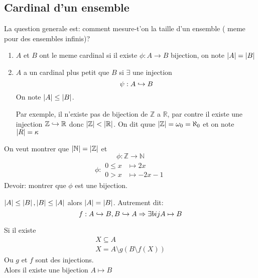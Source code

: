 \documentclass[../main.tex]{subfiles}
\begin{document}
\subsection{Cardinal d'un ensemble}
La question generale est: comment mesure-t'on la taille d'un ensemble ( meme pour des ensembles infinis)?\\
\begin{defn}\label{defn:cardinal_d_un_ensemble}
	\begin{enumerate}
		\item $A$ et  $B$ ont le meme cardinal si il existe $\phi: A \to B$ bijection, on note $\left\vert A\right\vert = \left\vert B\right\vert$\\
		\item $A$ a un cardinal plus petit que $B$ si $\exists$ une injection 
			\[ 
			\psi: A \hookrightarrow B
			\]
			On note $\left\vert A\right\vert \leq \left\vert B\right\vert$.

			Par exemple, il n'existe pas de bijection de $\mathbb{Z}$ a $\mathbb{R}$, par contre il existe une injection $\mathbb{Z} \hookrightarrow \mathbb{R}$ donc $\left\vert\mathbb{Z}\right\vert < \left\vert\mathbb{R}\right\vert$. On dit quue $\left\vert\mathbb{Z}\right\vert = \omega_0 = \aleph_0$ et on note $\left\vert R\right\vert= \kappa$
	\end{enumerate}
\end{defn}
\begin{exemple}
	On veut montrer que $\left\vert\mathbb{N}\right\vert = \left\vert\mathbb{Z}\right\vert$ et 
	\[ 
		\phi: \mathbb{Z} \to \mathbb{N}
	\]
	\begin{align*}
	\phi :
	\begin{aligned}
		0 \leq x &\mapsto 2x\\
	0>x &\mapsto -2x-1
	\end{aligned}
	\end{align*}
	Devoir: montrer que $\phi$ est une bijection.
\end{exemple}
\begin{thm}
	$\left\vert A\right\vert \leq \left\vert B\right\vert, \left\vert B\right\vert \leq \left\vert A\right\vert$ alors $\left\vert A\right\vert = \left\vert B\right\vert$.
	Autrement dit:
	\[ 
	f: A \hookrightarrow B, B \hookrightarrow A \Rightarrow \exists bij A \mapsto B
	\]
	
\end{thm}
\begin{lemma}
	
	Si il existe
	\begin{align*}
	X \subseteq A\\
	X = A \setminus g(B\setminus f(X))
	\end{align*}
	Ou $g$ et $f$ sont des injections.\\
	Alors il existe une bijection $A \mapsto B$
\end{lemma}
\end{document}
